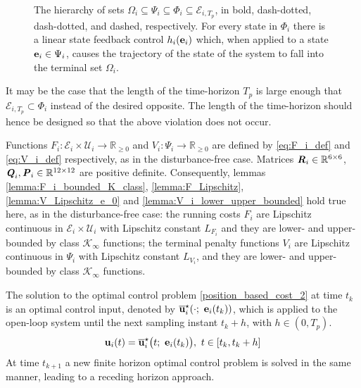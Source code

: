 \begin{figure}[ht!]
  \centering
  
  \caption{The hierarchy of sets
  $\Omega_i \subseteq \Psi_i \subseteq \Phi_i \subseteq \mathcal{E}_{i,T_p}$,
  in bold, dash-dotted, dash-dotted, and dashed, respectively.
  For every state in $\Phi_i$ there is a linear state feedback control
  $h_i(\bm{\mathbf{e}}_i)$ which, when applied to a state
  $\bm{\mathbf{e}}_i \in \Psi_i$, causes the trajectory of the state of the system to
  fall into the terminal set $\Omega_i$.}
  \label{fig:tightening_low_level}
\end{figure}

\begin{bw_box}
  \begin{remark}
    It may be the case that the length of the time-horizon $T_p$ is large enough
    that $\mathcal{E}_{i,T_p} \subset \Phi_i$ instead of the desired opposite.
    The length of the time-horizon should hence be designed so that the above
    violation does not occur.
    \label{remark:E_T_P_limit}
  \end{remark}
\end{bw_box}



Functions
$F_i : \mathcal{E}_i \times \mathcal{U}_i \to \mathbb{R}_{\geq 0}$ and
$V_i: \Psi_i \to \mathbb{R}_{\geq 0}$ are defined by \eqref{eq:F_i_def}
and \eqref{eq:V_i_def} respectively, as in the disturbance-free case.
Matrices $\bm{\mathit{R}}_i \in \mathbb{R}^{6 \times 6}$,
$\bm{\mathit{Q}}_i, \bm{\mathit{P}}_i \in \mathbb{R}^{12 \times 12}$ are positive definite.
Consequently, lemmas \eqref{lemma:F_i_bounded_K_class},
\eqref{lemma:F_Lipschitz}, \eqref{lemma:V_Lipschitz_e_0} and
\eqref{lemma:V_i_lower_upper_bounded} hold true here, as in the
disturbance-free case: the running costs $F_i$ are Lipschitz continuous in
$\mathcal{E}_i \times \mathcal{U}_i$ with Lipschitz constant $L_{F_i}$ and
they are lower- and upper-bounded by class $\mathcal{K}_{\infty}$ functions;
the terminal penalty functions $V_i$ are Lipschitz continuous in $\Psi_i$
with Lipschitz constant $L_{V_i}$, and they are lower- and upper-bounded
by class $\mathcal{K}_{\infty}$ functions.


The solution to the optimal control problem \eqref{position_based_cost_2}
at time $t_k$ is an optimal control input, denoted by
$\overline{\bm{\mathbf{u}}}_i^{\star}(\cdot;\ \bm{\mathbf{e}}_i(t_k))$, which
is applied to the open-loop system until the next sampling instant $t_k + h$,
with $h \in (0,T_p)$.
\begin{align}
  \bm{\mathbf{u}}_i(t) = \overline{\bm{\mathbf{u}}}_i^{\star}\big(t;\ \bm{\mathbf{e}}_i(t_k)\big),\  t \in [t_k, t_k + h]
 \label{eq:position_based_optimal_u_2}
\end{align}
At time $t_{k+1}$ a new finite horizon optimal control problem is solved in the
same manner, leading to a receding horizon approach.

